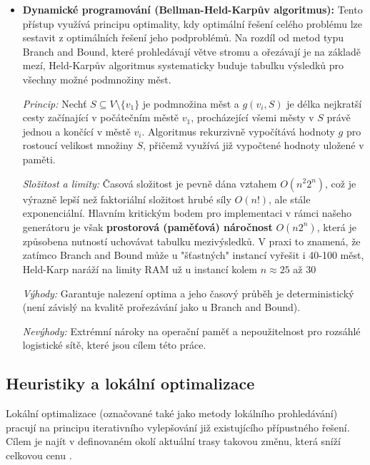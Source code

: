 \begin{itemize}
    \textit{Nevýhody:} V nejhorším případě (např. u špatně zvolené relaxace pro výpočet mezí) může složitost stále degradovat na exponenciální, což limituje jeho použití pro rozsáhlé logistické sítě %
    
\item \textbf{Dynamické programování (Bellman-Held-Karpův algoritmus):} 
Tento přístup využívá principu optimality, kdy optimální řešení celého problému lze sestavit z optimálních řešení jeho podproblémů. Na rozdíl od metod typu Branch and Bound, které prohledávají větve stromu a ořezávají je na základě mezí, Held-Karpův algoritmus systematicky buduje tabulku výsledků pro všechny možné podmnožiny měst.

\textit{Princip:} Nechť $S \subseteq V \setminus \{v_1\}$ je podmnožina měst a $g(v_i, S)$ je délka nejkratší cesty začínající v počátečním městě $v_1$, procházející všemi městy v $S$ právě jednou a končící v městě $v_i$. Algoritmus rekurzivně vypočítává hodnoty $g$ pro rostoucí velikost množiny $S$, přičemž využívá již vypočtené hodnoty uložené v paměti.

\textit{Složitost a limity:} Časová složitost je pevně dána vztahem $O(n^2 2^n)$, což je výrazně lepší než faktoriální složitost hrubé síly $O(n!)$, ale stále exponenciální. Hlavním kritickým bodem pro implementaci v rámci našeho generátoru je však \textbf{prostorová (paměťová) náročnost} $O(n 2^n)$, která je způsobena nutností uchovávat tabulku mezivýsledků. V praxi to znamená, že zatímco Branch and Bound může u "šťastných" instancí vyřešit i 40-100 měst, Held-Karp naráží na limity RAM už u instancí kolem $n \approx 25$ až $30$ %

\textit{Výhody:} Garantuje nalezení optima a jeho časový průběh je deterministický (není závislý na kvalitě prořezávání jako u Branch and Bound).

\textit{Nevýhody:} Extrémní nároky na operační paměť a nepoužitelnost pro rozsáhlé logistické sítě, které jsou cílem této práce.
\end{itemize}

\subsection{Heuristiky a lokální optimalizace}
Lokální optimalizace (označované také jako metody lokálního prohledávání) pracují na principu iterativního vylepšování již existujícího přípustného řešení. Cílem je najít v definovaném okolí aktuální trasy takovou změnu, která sníží celkovou cenu .

